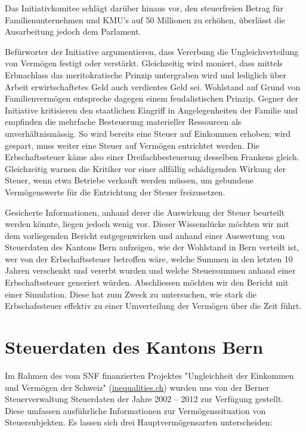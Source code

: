 \documentclass[a4paper, 12pt,liststotoc]{scrartcl}
\numberwithin{equation}{section}
\begin{document}
Das Initiativkomitee schlägt darüber hinaus vor, den steuerfreien Betrag
für Familienunternehmen und KMU's auf 50 Millionen zu erhöhen, überlässt
die Ausarbeitung jedoch dem Parlament.

Befürworter der Initiative argumentieren, dass Vererbung die
Ungleichverteilung von Vermögen festigt oder verstärkt. Gleichzeitig
wird moniert, dass mittels Erbnachlass das meritokratische Prinzip
untergraben wird und lediglich über Arbeit erwirtschaftetes Geld auch
verdientes Geld sei. Wohlstand auf Grund von Familienvermögen entspreche
dagegen einem feudalistischen Prinzip. Gegner der Initiative kritisieren
den staatlichen Eingriff in Angelegenheiten der Familie und empfinden
die mehrfache Besteuerung materieller Ressourcen als unverhältnismässig.
So wird bereits eine Steuer auf Einkommen erhoben; wird gespart, muss
weiter eine Steuer auf Vermögen entrichtet werden. Die Erbschaftssteuer
käme also einer Dreifachbesteuerung desselben Frankens gleich.
Gleichzeitig warnen die Kritiker vor einer allfällig schädigenden
Wirkung der Steuer, wenn etwa Betriebe verkauft werden müssen, um
gebundene Vermögenswerte für die Entrichtung der Steuer freizusetzen.

Gesicherte Informationen, anhand derer die Auswirkung der Steuer
beurteilt werden könnte, liegen jedoch wenig vor. Dieser Wissenslücke
möchten wir mit dem vorliegenden Bericht entgegenwirken und anhand einer
Auswertung von Steuerdaten des Kantons Bern aufzeigen, wie der Wohlstand
in Bern verteilt ist, wer von der Erbschaftssteuer betroffen wäre,
welche Summen in den letzten 10 Jahren verschenkt und vererbt wurden und
welche Steuersummen anhand einer Erbschaftssteuer generiert würden.
Abschliessen möchten wir den Bericht mit einer Simulation. Diese hat zum
Zweck zu untersuchen, wie stark die Erbschafssteuer effektiv zu einer
Umverteilung der Vermögen über die Zeit führt.

\section{Steuerdaten des Kantons
Bern}\label{steuerdaten-des-kantons-bern}

Im Rahmen des vom SNF finanzierten Projektes "Ungleichheit der Einkommen
und Vermögen der Schweiz" (\href{http://www.inequalities.ch}{inequalities.ch}) wurden uns von der Berner
Steuerverwaltung Steuerdaten der Jahre 2002 -- 2012 zur Verfügung
gestellt. Diese umfassen ausführliche Informationen zur
Vermögenssituation von Steuersubjekten. Es lassen sich drei
Hauptvermögensarten unterscheiden:
\end{document}
